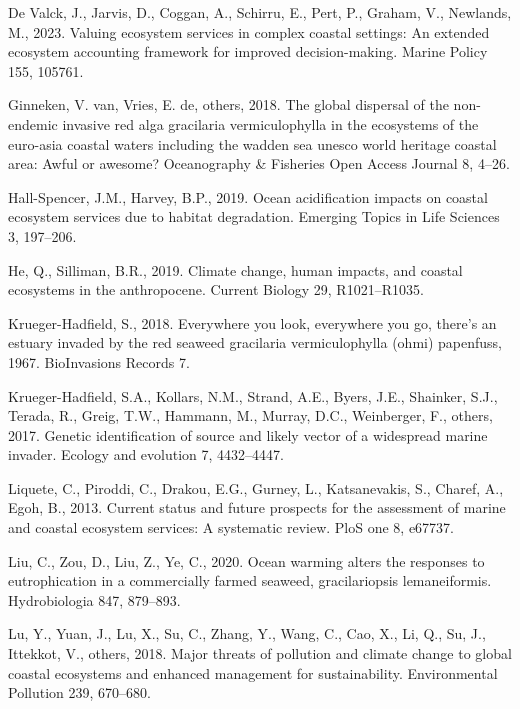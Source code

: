 \documentclass[
  letterpaper,
  DIV=11,
  numbers=noendperiod]{scrartcl}
\newlength{\cslhangindent}
\newenvironment{CSLReferences}[2] %
 {\begin{list}{}{%
  \setlength{\itemindent}{0pt}
  \setlength{\leftmargin}{0pt}
  \setlength{\parsep}{0pt}
  \ifodd #1
   \setlength{\leftmargin}{\cslhangindent}
   \setlength{\itemindent}{-1\cslhangindent}
  \fi
  \setlength{\itemsep}{#2\baselineskip}}}
 {\end{list}}
\begin{document}
\begin{CSLReferences}{1}{0}
De Valck, J., Jarvis, D., Coggan, A., Schirru, E., Pert, P., Graham, V.,
Newlands, M., 2023. Valuing ecosystem services in complex coastal
settings: An extended ecosystem accounting framework for improved
decision-making. Marine Policy 155, 105761.

Ginneken, V. van, Vries, E. de, others, 2018. The global dispersal of
the non-endemic invasive red alga gracilaria vermiculophylla in the
ecosystems of the euro-asia coastal waters including the wadden sea
unesco world heritage coastal area: Awful or awesome? Oceanography \&
Fisheries Open Access Journal 8, 4--26.

Hall-Spencer, J.M., Harvey, B.P., 2019. Ocean acidification impacts on
coastal ecosystem services due to habitat degradation. Emerging Topics
in Life Sciences 3, 197--206.

He, Q., Silliman, B.R., 2019. Climate change, human impacts, and coastal
ecosystems in the anthropocene. Current Biology 29, R1021--R1035.

Krueger-Hadfield, S., 2018. Everywhere you look, everywhere you go,
there's an estuary invaded by the red seaweed gracilaria vermiculophylla
(ohmi) papenfuss, 1967. BioInvasions Records 7.

Krueger-Hadfield, S.A., Kollars, N.M., Strand, A.E., Byers, J.E.,
Shainker, S.J., Terada, R., Greig, T.W., Hammann, M., Murray, D.C.,
Weinberger, F., others, 2017. Genetic identification of source and
likely vector of a widespread marine invader. Ecology and evolution 7,
4432--4447.

Liquete, C., Piroddi, C., Drakou, E.G., Gurney, L., Katsanevakis, S.,
Charef, A., Egoh, B., 2013. Current status and future prospects for the
assessment of marine and coastal ecosystem services: A systematic
review. PloS one 8, e67737.

Liu, C., Zou, D., Liu, Z., Ye, C., 2020. Ocean warming alters the
responses to eutrophication in a commercially farmed seaweed,
gracilariopsis lemaneiformis. Hydrobiologia 847, 879--893.

Lu, Y., Yuan, J., Lu, X., Su, C., Zhang, Y., Wang, C., Cao, X., Li, Q.,
Su, J., Ittekkot, V., others, 2018. Major threats of pollution and
climate change to global coastal ecosystems and enhanced management for
sustainability. Environmental Pollution 239, 670--680.


\end{CSLReferences}
\end{document}
